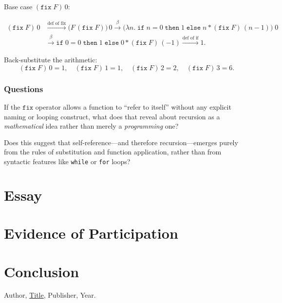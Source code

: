 \documentclass{article}
\theoremstyle{theorem}
\theoremstyle{definition}
\theoremstyle{remark}
\begin{document}
\noindent Base case $(\mathtt{fix}\;F)\,0$:

\[
\begin{aligned}
(\mathtt{fix}\;F)\,0
&\xrightarrow{\text{def of fix}} \big(F\,(\mathtt{fix}\;F)\big)\,0
\xrightarrow{\beta} \big(\lambda n.\; \mathtt{if}\; n=0\; \mathtt{then}\; 1\; \mathtt{else}\; n * (\mathtt{fix}\;F)\,(n-1)\big)\;0\\
&\xrightarrow{\beta} \mathtt{if}\; 0=0\; \mathtt{then}\; 1\; \mathtt{else}\; 0 * (\mathtt{fix}\;F)\,(-1)
\xrightarrow{\text{def of if}} 1.
\end{aligned}
\]

\noindent Back-substitute the arithmetic:
\[
(\mathtt{fix}\;F)\,0 = 1,\quad
(\mathtt{fix}\;F)\,1 = 1,\quad
(\mathtt{fix}\;F)\,2 = 2,\quad
(\mathtt{fix}\;F)\,3 = \boxed{6}.
\]



\subsubsection{Questions}

If the $\mathtt{fix}$ operator allows a function to ``refer to itself'' without any explicit naming or looping construct, what does that reveal about recursion as a \emph{mathematical} idea rather than merely a \emph{programming} one? 

Does this suggest that self-reference---and therefore recursion---emerges purely from the rules of substitution and function application, rather than from syntactic features like \texttt{while} or \texttt{for} loops?

\section{Essay}

\section{Evidence of Participation}

\section{Conclusion}\label{conclusion}

\begin{thebibliography}{99}
 Author, \href{https://en.wikipedia.org/wiki/LaTeX}{Title}, Publisher, Year.
\end{thebibliography}
\end{document}
